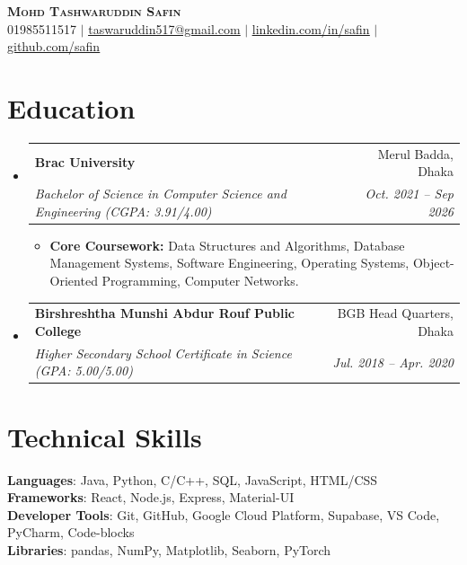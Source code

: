 \documentclass[letterpaper,10pt]{article}
\makeatletter
\newcommand{\resumeItem}[1]{
  \item\small{
    {#1 \vspace{-2pt}}
  }
}
\newcommand{\resumeSubheading}[4]{
  \vspace{-2pt}\item
    \begin{tabular*}{0.97\textwidth}[t]{l@{\extracolsep{\fill}}r}
      \textbf{#1} & #2 \\
      \textit{\small#3} & \textit{\small #4} \\
    \end{tabular*}\vspace{-7pt}
}
\newcommand{\resumeSubHeadingListStart}{\begin{itemize}[leftmargin=0.15in, label={}]}
\newcommand{\resumeSubHeadingListEnd}{\end{itemize}}
\newcommand{\resumeItemListStart}{\begin{itemize}}
\newcommand{\resumeItemListEnd}{\end{itemize}\vspace{-5pt}}
\makeatother
\begin{document}
\begin{center}
    \textbf{\Huge \scshape Mohd Tashwaruddin Safin} \\ \vspace{1pt}
    \small 01985511517 $|$ \href{mailto:taswaruddin517@gmail.com}{\underline{taswaruddin517@gmail.com}} $|$ 
    \href{https://www.linkedin.com/in/tashwar-uddin-safin-7676b0237/}{\underline{linkedin.com/in/safin}} $|$
    \href{https://github.com/Taswaruddin007}{\underline{github.com/safin}}
\end{center}


\section{Education}
  \resumeSubHeadingListStart
    \resumeSubheading
      {Brac University}{Merul Badda, Dhaka}
      {Bachelor of Science in Computer Science and Engineering (CGPA: 3.91/4.00)}{Oct. 2021 -- Sep 2026}
      \resumeItemListStart
        \resumeItem{\textbf{Core Coursework:} Data Structures and Algorithms, Database Management Systems, Software Engineering, Operating Systems, Object-Oriented Programming, Computer Networks.}
     \resumeItemListEnd
    \resumeSubheading
      {Birshreshtha Munshi Abdur Rouf Public College}{BGB Head Quarters, Dhaka}
      {Higher Secondary School Certificate in Science (GPA: 5.00/5.00)}{Jul. 2018 -- Apr. 2020}
  \resumeSubHeadingListEnd


\section{Technical Skills}
 \begin{itemize}[leftmargin=0.15in, label={}]
    \small{\item{
     \textbf{Languages}{: Java, Python, C/C++, SQL, JavaScript, HTML/CSS} \\
     \textbf{Frameworks}{: React, Node.js, Express, Material-UI} \\
     \textbf{Developer Tools}{: Git, GitHub, Google Cloud Platform, Supabase, VS Code, PyCharm, Code-blocks} \\
     \textbf{Libraries}{: pandas, NumPy, Matplotlib, Seaborn, PyTorch}
    }}
 \end{itemize}


\end{document}
